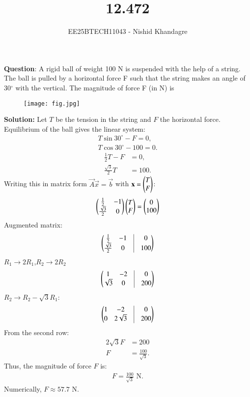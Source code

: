 \documentclass[journal]{IEEEtran}
\title{12.472}
\author{EE25BTECH11043 - Nishid Khandagre}
\begin{document}
\maketitle

\renewcommand{\thefigure}{\theenumi}
\renewcommand{\thetable}{\theenumi}


\textbf{Question}:
A rigid ball of weight 100 N is suspended with the help of a string. The ball is pulled by a horizontal force F such that the string makes an angle of 30$^\circ$ with the vertical. The magnitude of force F (in N) is 

\begin{figure}[H]
\centering
\texttt{[image: fig.jpg]}
\caption{}
\label{fig:2}
\end{figure}

\textbf{Solution: }
Let $T$ be the tension in the string and $F$ the horizontal force.
Equilibrium of the ball gives the linear system:
\begin{align}
T\sin 30^\circ - F = 0, \\
T\cos 30^\circ - 100 = 0.
\end{align}
\begin{align}
\frac{1}{2}T - F &= 0, \\
\frac{\sqrt3}{2}T &= 100.
\end{align}
Writing this in matrix form $\vec{A}\vec{x}=\vec{b}$ with $\mathbf{x}=\begin{pmatrix}T \\ F\end{pmatrix}$:
\begin{align}
\begin{pmatrix}
\frac12 & -1 \\
\frac{\sqrt3}{2} & 0
\end{pmatrix}
\begin{pmatrix}T \\ F\end{pmatrix}
=
\begin{pmatrix}0 \\ 100\end{pmatrix}
\end{align}
Augmented matrix:
\begin{align}
\myvec{
\frac12 & -1 & \vrule & 0 \\
\frac{\sqrt3}{2} & 0 & \vrule & 100
}
\end{align}
$R_1 \rightarrow 2R_1$,$R_2 \rightarrow 2R_2$
\begin{align}
\myvec{
1 & -2 & \vrule & 0 \\
\sqrt3 & 0 & \vrule & 200
}
\end{align}
$R_2 \rightarrow R_2 - \sqrt3 R_1$:
\begin{align}
\myvec{
1 & -2 & \vrule & 0 \\
0 & 2\sqrt3 & \vrule & 200
}
\end{align}
From the second row:
\begin{align}
2\sqrt3 F &= 200 \\
F &= \frac{100}{\sqrt3}.
\end{align}
Thus, the magnitude of force $F$ is:
\begin{align}
F = \frac{100}{\sqrt3} \text{ N}.
\end{align}
Numerically,
$F \approx 57.7 \text{ N}$.
\end{document}

